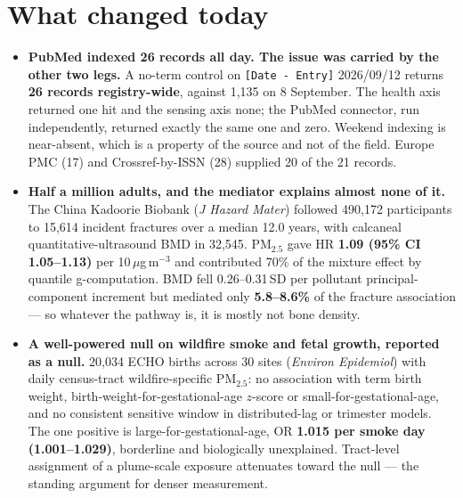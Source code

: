 \documentclass[10pt]{article}
\begin{document}
\vspace{3mm}

\section*{\sffamily\bfseries\color{Deep}What changed today}
\vspace{-1.5mm}{\color{Amber}\rule{\linewidth}{1.1pt}}\vspace{2.5mm}

\footnotesize
\begin{itemize}
\item \textbf{PubMed indexed 26 records all day. The issue was carried by the other two
legs.} A no-term control on \texttt{[Date - Entry]} 2026/09/12 returns \textbf{26 records
registry-wide}, against 1{,}135 on 8 September. The health axis returned one hit and the
sensing axis none; the PubMed connector, run independently, returned exactly the same one
and zero. Weekend indexing is near-absent, which is a property of the source and not of
the field. Europe PMC (17) and Crossref-by-ISSN (28) supplied 20 of the 21 records.

\item \textbf{Half a million adults, and the mediator explains almost none of it.}
The China Kadoorie Biobank (\textit{J Hazard Mater}) followed 490{,}172 participants to
15{,}614 incident fractures over a median 12.0 years, with calcaneal quantitative-ultrasound
BMD in 32{,}545. PM$_{2.5}$ gave HR \textbf{1.09 (95\% CI 1.05--1.13)} per
10\,$\mu$g\,m$^{-3}$ and contributed 70\% of the mixture effect by quantile g-computation.
BMD fell 0.26--0.31\,SD per pollutant principal-component increment but mediated only
\textbf{5.8--8.6\%} of the fracture association --- so whatever the pathway is, it is mostly
not bone density.

\item \textbf{A well-powered null on wildfire smoke and fetal growth, reported as a null.}
20{,}034 ECHO births across 30 sites (\textit{Environ Epidemiol}) with daily
census-tract wildfire-specific PM$_{2.5}$: no association with term birth weight,
birth-weight-for-gestational-age $z$-score or small-for-gestational-age, and no consistent
sensitive window in distributed-lag or trimester models. The one positive is
large-for-gestational-age, OR \textbf{1.015 per smoke day (1.001--1.029)}, borderline and
biologically unexplained. Tract-level assignment of a plume-scale exposure attenuates
toward the null --- the standing argument for denser measurement.


\end{itemize}
\end{document}
